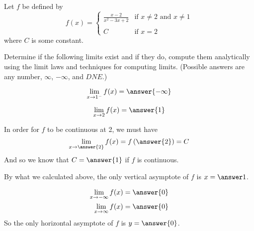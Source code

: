 \documentclass{ximera}
\author{Nela Lakos \and Kyle Parsons}
\begin{document}
\begin{exercise}

	Let $f$ be defined by
	\[ f(x) = \begin{cases} 
		\frac{x-2}{x^2-3x+2} & \text{if } x\neq 2 \text{ and } x\neq 1 \\ \\
		C & \text{if } x=2
		\end{cases} \]
	where $C$ is some constant.

	Determine if the following limits exist and if they do, compute them analytically using the limit laws and techniques for computing limits.  
	(Possible answers are any number, $\infty$, $-\infty$, and $DNE$.)

	\begin{exercise}
		\[ \lim_{x\to1^-}f(x) = \answer{-\infty} \]

		\begin{exercise}
			\[ \lim_{x\to2}f(x) = \answer{1}\]
		\end{exercise}
	\end{exercise}

	\begin{exercise}
		In order for $f$ to be continuous at 2, we must have
		\[ \lim_{x\to\answer{2}}f(x) = f\left(\answer{2}\right) = C \]
		And so we know that $C=\answer{1}$ if $f$ is continuous.
	\end{exercise}

	\begin{exercise}
		By what we calculated above, the only vertical asymptote of $f$ is $x=\answer1$.
	\end{exercise}

	\begin{exercise}
		\begin{align*}
			\lim_{x\to-\infty}f(x) &= \answer{0}\\
			\lim_{x\to\infty}f(x) &= \answer{0}
		\end{align*}
		So the only horizontal asymptote of $f$ is $y=\answer{0}$.
	\end{exercise}

\end{exercise}
\end{document}
